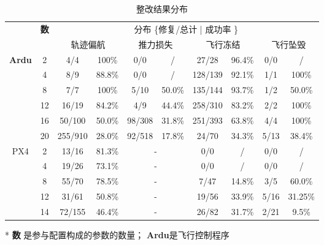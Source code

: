 \begin{table*}[htb]
\caption{整改结果分布}
\label{tab:fix_repair_detial}
\centering
\begin{threeparttable}
\begin{tabular}{c|c|cc|cc|cc|cc}
        \toprule[1.5pt]
        ~ & \multirow{2}{*}{\textbf{数}} & \multicolumn{8}{c}{{分布  \{修复/总计 | 成功率 \}}} \\
        \cmidrule{3-10}
        ~ & ~ &  \multicolumn{2}{c|}{{轨迹偏航}} & \multicolumn{2}{c|}{{推力损失}} & \multicolumn{2}{c|}{{飞行冻结}} & \multicolumn{2}{c}{{飞行坠毁}} \\
        
        \midrule[0.8pt]
        
        \multirow{6}{*}{\textbf{Ardu}} & 2   & 4/4 & 100\% & 0/0 &/& 27/28 & 96.4\% & 0/0 &/\\

        ~ & 4    & 8/9 & 88.8\% & 0/0 &/& 128/139 & 92.1\% & 1/1 & 100\%\\
        
        ~ & 8    & 7/7 & 100\% & 5/10 & 50.0\% & 135/144 & 93.7\% & 1/2 & 50.0\%  \\
    
        ~ & 12   & 16/19 & 84.2\% & 4/9 & 44.4\% & 258/310 & 83.2\% &  2/2 & 100\%\\
        
        ~ & 16 &  50/100 & 50.0\% & 98/308 & 31.8\% & 251/393 & 63.8\% & 4/4 & 100\%\\
        
        ~ & 20  & 255/910 & 28.0\% & 92/518 & 17.8\% & 24/70 & 34.3\% & 5/13 & 38.4\%\\
        
        \midrule[0.8pt]
        
         \multirow{5}{*}{{PX4}} & 2 & 13/16 & 81.3\% & \multicolumn{2}{c|}{-} & 0/0 &/& 0/0 &/\\
         
         ~ & 4  & 19/26 & 73.1\% & \multicolumn{2}{c|}{-} & 0/0 &/& 0/0 &/\\

        ~ & 8   &  55/70 & 78.5\% & \multicolumn{2}{c|}{-} & 7/47 & 14.8\% & 3/5 & 60.0\%\\
        
        ~ & 12    & 31/61 & 50.8\% & \multicolumn{2}{c|}{-} & 19/56 & 33.9\% & 5/16 & 31.25\%  \\

        ~ & 14    & 72/155 & 46.4\% & \multicolumn{2}{c|}{-} & 26/82 & 31.7\% &  2/21 & 9.5\%\\

        \bottomrule[1.5pt]
\end{tabular}
\begin{tablenotes}
\footnotesize
\item[*] 
\textbf{数} 是参与配置构成的参数的数量；
\textbf{Ardu}是飞行控制程序
\end{tablenotes}
\end{threeparttable}
\end{table*}
